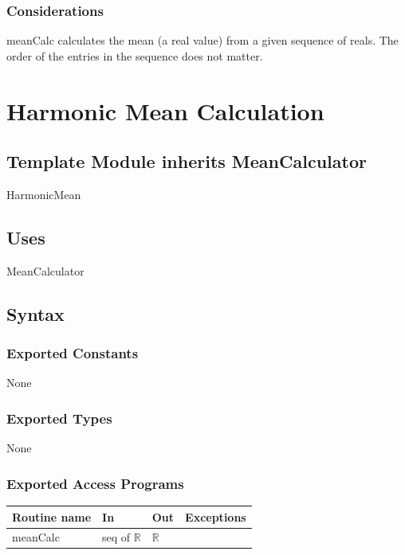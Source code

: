 \documentclass[12pt,fleqn]{examtst}
\begin{document}
\subsubsection* {Considerations}

meanCalc calculates the mean (a real value) from a given sequence of reals.
The order of the entries in the sequence does not matter.


\newpage

\section* {Harmonic Mean Calculation}

\subsection*{Template Module inherits MeanCalculator}

HarmonicMean

\subsection* {Uses}

MeanCalculator

\subsection* {Syntax}

\subsubsection* {Exported Constants}

None

\subsubsection* {Exported Types}

None 

\subsubsection* {Exported Access Programs}

\begin{tabular}{| l | l | l | p{5cm} |}
\hline
\textbf{Routine name} & \textbf{In} & \textbf{Out} & \textbf{Exceptions}\\
\hline
meanCalc & seq of $\mathbb{R}$ & $\mathbb{R}$ & ~\\
\hline
\end{tabular}
\end{document}
